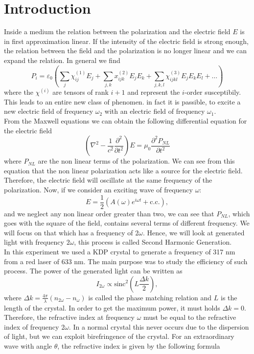 \documentclass[a4paper,10pt]{article}
\begin{document}
\section{Introduction}
Inside a medium the relation between the polarization and the electric field $E$ is in first approximation linear. If the intensity of the electric field is strong enough, the relation between the field and the polarization is no longer linear and we can expand the relation. In general we find
\begin{equation}P_i  = \varepsilon_0\left(\sum_j \chi_{ij}^{(1)} E_j + \sum_{j,k}x_{ijk}^{(2)}E_jE_k + \sum_{j,k,l}\chi_{ijkl}^{(3)}E_jE_kE_l + \dots \right)\end{equation}
where the $\chi^{(i)}$ are tensors of rank $i+1$ and represent the $i$-order susceptibily. This leads to an entire new class of phenomen. in fact it is passible, to excite a new electric field of frequency $\omega_2$ with an electric field of frequency $\omega_1$.\\
From the Maxwell equations we can obtain \cite{saleh} the following differential equation for the electric field
\begin{equation}\left(\nabla^2 - \frac{1}{c^2}\frac{\partial^2}{\partial t^2}\right)E = \mu_0\frac{\partial^2 P_{NL}}{\partial t^2}\end{equation}
where $P_{NL}$ are the non linear terms of the polarization. We can see from this equation that the non linear polarization acts like a source for the electric field. Therefore, the electric field will oscillate at the same frequency of the polarization. Now, if we consider an exciting wave of frequency $\omega$:
\[E = \frac{1}{2}(A(\omega)e^{i\omega t} + \text{c.c.}), \]
and we neglect any non linear order greater than two, we can see that $P_{NL}$, which goes with the square of the field, contains several terms of different frequency. We will focus on that which has a frequency of $2\omega$. Hence, we will look at generated light with frequency $2\omega$, this process is called Second Harmonic Generation.\\
In this experiment we used a KDP crystal to generate a frequency of 317 nm from a red laser of 633 nm. The main purpose was to study the efficiency of such process. The power of the generated light can be written \cite{saleh} as
\[I_{2\omega} \propto \text{sinc}^2\left(L\frac{\Delta k}{2 }\right),\]
where $\Delta k = \frac{4\pi}{\lambda}(n_{2\omega} - n_\omega)$ is called the phase matching relation and $L$ is the length of the crystal. In order to get the maximum power, it must holds $\Delta k = 0$. Therefore, the refractive index at frequency $\omega$ must be equal to the refractive index of frequency $2\omega$. In a normal crystal this never occurs due to the dispersion of light, but we can exploit birefringence of the crystal. For an extraordinary wave with angle $\theta$, the refractive index is given by the following formula \cite{saleh}
\end{document}
